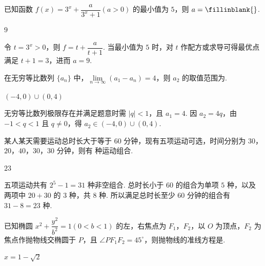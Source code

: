 \begin{problem}
已知函数 \(f(x)=3^x+\dfrac{a}{3^x+1}(a>0)\) 的最小值为 \(5\)，则 \(a=\fillinblank{}\).
\end{problem}

\begin{answer}
\(9\)
\end{answer}

\begin{solution}
令 \(t=3^x>0\)，则 \(f=t+\dfrac{a}{t+1}\). 当最小值为 \(5\) 时，对 \(t\) 作配方或求导可得最优点满足 \(t+1=3\)，进而 \(a=9\).
\end{solution}

\begin{problem}
在无穷等比数列 \(\{a_n\}\) 中，\(\lim\limits_{n\to\infty}(a_1-a_n)=4\)，则 \(a_2\) 的取值范围为\fillinblank{}.
\end{problem}

\begin{answer}
\((-4,0)\cup(0,4)\)
\end{answer}

\begin{solution}
无穷等比数列极限存在并满足题意时需 \(|q|<1\)，且 \(a_1=4\). 因 \(a_2=4q\)，由 \(-1<q<1\) 且 \(q\ne0\)，得 \(a_2\in(-4,0)\cup(0,4)\).
\end{solution}

\begin{problem}
某人某天需要运动总时长大于等于 \(60\) 分钟，现有五项运动可选，时间分别为 \(30\)，\(20\)，\(40\)，\(30\)，\(30\) 分钟，则有\fillinblank{} 种运动组合.
\end{problem}

\begin{answer}
\(23\)
\end{answer}

\begin{solution}
五项运动共有 \(2^5-1=31\) 种非空组合. 总时长小于 \(60\) 的组合为单项 \(5\) 种，以及两项中 \(20+30\) 的 \(3\) 种，共 \(8\) 种. 所以满足总时长至少 \(60\) 分钟的组合有 \(31-8=23\) 种.
\end{solution}

\begin{problem}
已知椭圆 \(x^2+\dfrac{y^2}{b^2}=1(0<b<1)\) 的左，右焦点为 \(F_1\)，\(F_2\)，以 \(O\) 为顶点，\(F_2\) 为焦点作抛物线交椭圆于 \(P\)，且 \(\angle PF_1F_2=45^\circ\)，则抛物线的准线方程是\fillinblank{}.
\end{problem}

\begin{answer}
\(x=1-\sqrt2\)
\end{answer}

